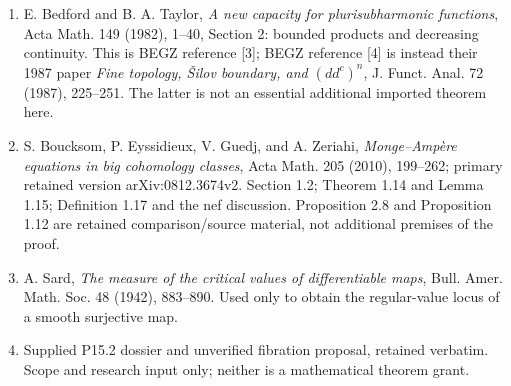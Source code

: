 \documentclass[
  11pt,
]{article}
\providecommand{\tightlist}{%
  \setlength{\itemsep}{0pt}\setlength{\parskip}{0pt}}
\begin{document}
\begin{enumerate}
\def\labelenumi{\arabic{enumi}.}
\tightlist
\item
  E. Bedford and B. A. Taylor, \emph{A new capacity for plurisubharmonic functions}, Acta Math. 149 (1982), 1--40, Section 2: bounded products and decreasing continuity. This is BEGZ reference {[}3{]}; BEGZ reference {[}4{]} is instead their 1987 paper \emph{Fine topology, Šilov boundary, and \((dd^c)^n\)}, J. Funct. Anal. 72 (1987), 225--251. The latter is not an essential additional imported theorem here.
\item
  S. Boucksom, P. Eyssidieux, V. Guedj, and A. Zeriahi, \emph{Monge--Ampère equations in big cohomology classes}, Acta Math. 205 (2010), 199--262; primary retained version arXiv:0812.3674v2. Section 1.2; Theorem 1.14 and Lemma 1.15; Definition 1.17 and the nef discussion. Proposition 2.8 and Proposition 1.12 are retained comparison/source material, not additional premises of the proof.
\item
  A. Sard, \emph{The measure of the critical values of differentiable maps}, Bull. Amer. Math. Soc. 48 (1942), 883--890. Used only to obtain the regular-value locus of a smooth surjective map.
\item
  Supplied P15.2 dossier and unverified fibration proposal, retained verbatim. Scope and research input only; neither is a mathematical theorem grant.
\end{enumerate}
\end{document}
